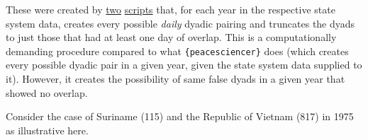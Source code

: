 \documentclass[
  11pt,
]{article}
\begin{document}
These were created by \href{https://github.com/svmiller/peacesciencer/blob/master/data-raw/false_cow_dyads.R}{two} \href{https://github.com/svmiller/peacesciencer/blob/master/data-raw/false_gw_dyads.R}{scripts} that, for each year in the respective state system data, creates every possible \emph{daily} dyadic pairing and truncates the dyads to just those that had at least one day of overlap. This is a computationally demanding procedure compared to what \texttt{\{peacesciencer\}} does (which creates every possible dyadic pair in a given year, given the state system data supplied to it). However, it creates the possibility of same false dyads in a given year that showed no overlap.

Consider the case of Suriname (115) and the Republic of Vietnam (817) in 1975 as illustrative here.
\end{document}
